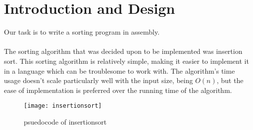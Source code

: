 \section{Introduction and Design}

Our task is to write a sorting program in assembly.\\
\\
The sorting algorithm that was decided upon to be implemented was insertion sort. This sorting algorithm is relatively simple, making it easier to implement it in a language which can be troublesome to work with. The algorithm's time usage doesn't scale particularly well with the input size, being $O(n)$, but the ease of implementation is preferred over the running time of the algorithm.


\begin{figure}[h]
  \centering
  \texttt{[image: insertionsort]}
 \caption{psuedocode of insertionsort}
\end{figure}











